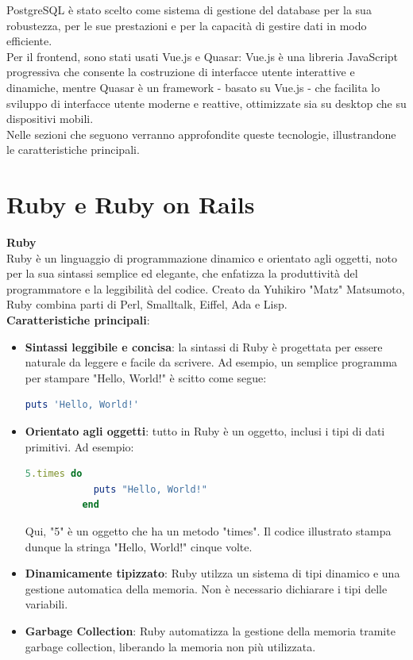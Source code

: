 \documentclass[a4paper, 12pt]{book}
\begin{document}
PostgreSQL è stato scelto come sistema di gestione del database per la sua robustezza, per le sue prestazioni e per
la capacità di gestire dati in modo efficiente.\\

Per il frontend, sono stati usati Vue.js e Quasar: Vue.js è una libreria JavaScript progressiva che consente la costruzione di interfacce utente interattive
e dinamiche, mentre Quasar è un framework - basato su Vue.js - che facilita lo sviluppo di interfacce utente moderne e reattive, ottimizzate sia su desktop
che su dispositivi mobili.\\

Nelle sezioni che seguono verranno approfondite queste tecnologie, illustrandone le caratteristiche principali.\\

\section{Ruby e Ruby on Rails}

 {\Large\textbf{Ruby}}\\

Ruby \cite{Ruby} è un linguaggio di programmazione dinamico e orientato agli oggetti, noto per la sua sintassi semplice ed elegante, che enfatizza la produttività del
programmatore e la leggibilità del codice.
Creato da Yuhikiro "Matz" Matsumoto, Ruby combina parti di Perl, Smalltalk, Eiffel, Ada e Lisp.\\

\textbf{Caratteristiche principali}:

\begin{itemize}
  \item \textbf{Sintassi leggibile e concisa}: la sintassi di Ruby è progettata per essere naturale da leggere e facile da scrivere. Ad esempio, un semplice
        programma per stampare "Hello, World!" è scitto come segue:\\
        \begin{lstlisting}[language=ruby]
          puts 'Hello, World!'
        \end{lstlisting}
  \item \textbf{Orientato agli oggetti}: tutto in Ruby è un oggetto, inclusi i tipi di dati primitivi. Ad esempio:\\
        \begin{lstlisting}[language=ruby]
          5.times do
            puts "Hello, World!"
          end
        \end{lstlisting}
        Qui, "5" è un oggetto che ha un metodo "times". Il codice illustrato stampa dunque la stringa "Hello, World!" cinque volte.
  \item \textbf{Dinamicamente tipizzato}: Ruby utilzza un sistema di tipi dinamico e una gestione automatica della memoria. Non è
        necessario dichiarare i tipi delle variabili.
  \item \textbf{Garbage Collection}: Ruby automatizza la gestione della memoria tramite garbage collection, liberando la memoria non più utilizzata.\\
\end{itemize}
\end{document}
